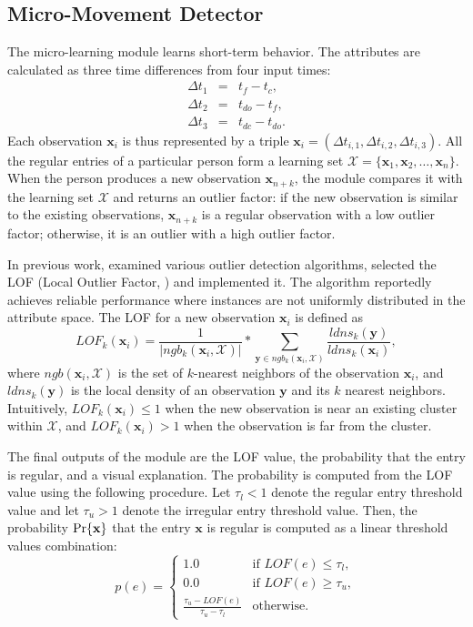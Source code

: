 \subsection{Micro-Movement Detector}
\label{sec:modules:micro}

The micro-learning module learns short-term behavior. The attributes are calculated as three time differences from four input times:
\begin{eqnarray}
   \Delta t_1 &=& t_f-t_c, \\
    \Delta t_2 &=& t_{do}-t_f, \\
    \Delta t_3 &=& t_{dc}-t_{do}.
\end{eqnarray}
Each observation $\mathbf{x}_i$ is thus represented by a triple $\mathbf{x}_i=(\Delta t_{i,1},\Delta t_{i,2},\Delta t_{i,3})$. All the regular entries of a particular person form a learning set $\mathcal{X}=\{\mathbf{x}_1,\mathbf{x}_2,\dots ,\mathbf{x}_n\}$. When the person produces a new observation $\mathbf{x}_{n+k}$, the module compares it with the learning set $\mathcal{X}$ and returns an outlier factor: if the new observation is similar to the existing observations, $\mathbf{x}_{n+k}$ is a regular observation with a low outlier factor; otherwise, it is an outlier with a high outlier factor.

In previous work, \cite{Tusar2006} examined various outlier detection algorithms, selected the LOF (Local Outlier Factor, \citep{Breunig2001}) and implemented it. The algorithm reportedly achieves reliable performance where instances are not uniformly distributed in the attribute space. 
The LOF for a new observation $\mathbf{x}_i$ is defined as 
\begin{equation}
LOF_k (\mathbf{x}_i )=\frac{1}{|ngb_k (\mathbf{x}_i,\mathcal{X})|} * \sum_{\mathbf{y} \in ngb_k(\mathbf{x}_i,\mathcal{X})} \frac{ldns_k(\mathbf{y})}{ldns_k (\mathbf{x}_i)},
\end{equation}
where $ngb(\mathbf{x}_i,\mathcal{X})$ is the set of $k$-nearest neighbors of the observation $\mathbf{x}_i$, and $ldns_k(\mathbf{y})$ is the local density of an observation $\mathbf{y}$ and its $k$ nearest neighbors. Intuitively, $LOF_k (\mathbf{x}_i ) \leq 1$ when the new observation is near an existing cluster within $\mathcal{X}$, and $LOF_k (\mathbf{x}_i )  >1$ when the observation is far from the cluster.

The final outputs of the module are the LOF value, the probability that the entry is regular, and a visual explanation. The probability is computed from the LOF value using the following procedure. Let $\tau_l < 1$ denote the regular entry threshold value and let $\tau_u > 1$ denote the irregular entry threshold value. Then, the probability $\text{Pr}\{\mathbf{x}\}$ that the entry $\mathbf{x}$ is regular is computed as a linear threshold values combination:
\begin{equation}
   p(e) =  \begin{cases} 
1.0 & \text{if } LOF(e) \leq \tau_l, \\
0.0 & \text{if } LOF(e) \geq \tau_u, \\
\frac{\tau_u-LOF(e)}{\tau_u-\tau_l} & \text{otherwise}.
\end{cases}
\end{equation}



